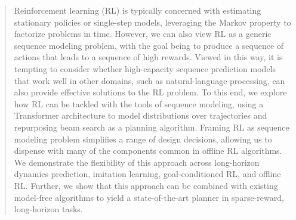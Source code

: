 \begin{abstract}
Reinforcement learning (RL) is typically concerned with estimating stationary policies or single-step models, leveraging the Markov property to factorize problems in time.
However, we can also view RL as a generic sequence modeling problem, with the goal being to produce a sequence of actions that leads to a sequence of high rewards.
Viewed in this way, it is tempting to consider whether high-capacity sequence prediction models that work well in other domains, such as natural-language processing, can also provide effective solutions to the RL problem.
To this end, we explore how RL can be tackled with the tools of sequence modeling, using a Transformer architecture to model distributions over trajectories and repurposing beam search as a planning algorithm.
Framing RL as sequence modeling problem simplifies a range of design decisions, allowing us to dispense with many of the components common in offline RL algorithms.
We demonstrate the flexibility of this approach across long-horizon dynamics prediction, imitation learning, goal-conditioned RL, and offline RL.
Further, we show that this approach can be combined with existing model-free algorithms to yield a state-of-the-art planner in sparse-reward, long-horizon tasks.
\end{abstract}
